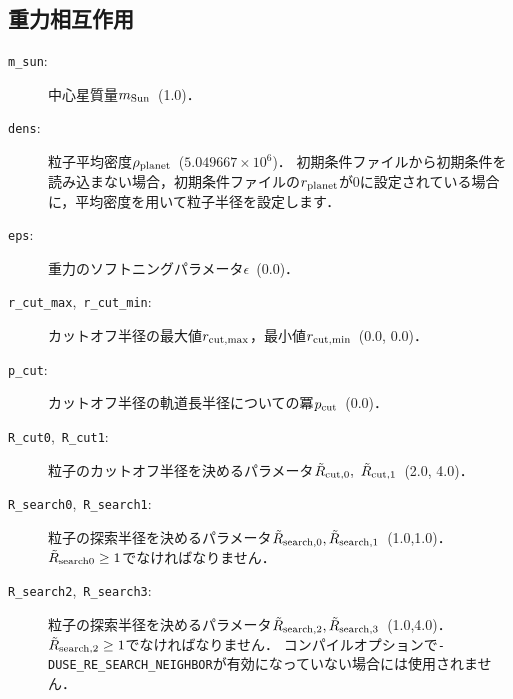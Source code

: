 \documentclass[12pt,a4paper,dvipdfmx]{jsarticle}
\begin{document}
\subsection{重力相互作用\label{paramg}}

\begin{description}
\item[\texttt{m\_sun}:]
中心星質量$m_{\rm Sun}$\ (1.0)．
\item[\texttt{dens}:]
粒子平均密度$\rho_{\rm planet}$\ ($5.049667\times 10^{6}$)．
初期条件ファイルから初期条件を読み込まない場合，初期条件ファイルの$r_{\rm planet}$が0に設定されている場合に，平均密度を用いて粒子半径を設定します．
\item[\texttt{eps}:]
重力のソフトニングパラメータ$\epsilon$\ ($0.0$)．
\item[\texttt{r\_cut\_max},\ \texttt{r\_cut\_min}:]
カットオフ半径の最大値$r_{\rm cut,max}$，最小値$r_{\rm cut,min}$\ (0.0, 0.0)．

\item[\texttt{p\_cut}:]
カットオフ半径の軌道長半径についての冪$p_{\rm cut}$\ (0.0)．

\item[\texttt{R\_cut0},\ \texttt{R\_cut1}:]
粒子のカットオフ半径を決めるパラメータ$\tilde{R}_{\rm cut,0},\ \tilde{R}_{\rm cut,1}$\ (2.0, 4.0)．

\item[\texttt{R\_search0},\ \texttt{R\_search1}:]
粒子の探索半径を決めるパラメータ$\tilde{R}_{\rm search,0},\tilde{R}_{\rm search,1}$\ (1.0,1.0)．
$\tilde{R}_{\rm search0}\geq 1$でなければなりません．

\item[\texttt{R\_search2},\ \texttt{R\_search3}:]
粒子の探索半径を決めるパラメータ$\tilde{R}_{\rm search,2},\tilde{R}_{\rm search,3}$\ (1.0,4.0)．
$\tilde{R}_{\rm search,2}\geq 1$でなければなりません．
コンパイルオプションで\texttt{-DUSE\_RE\_SEARCH\_NEIGHBOR}が有効になっていない場合には使用されません．



\end{description}
\end{document}
